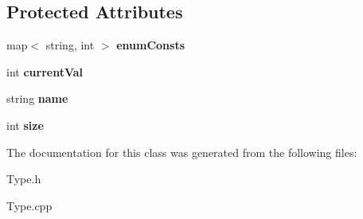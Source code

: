 \subsection*{Protected Attributes}
\begin{DoxyCompactItemize}
\item 
\hypertarget{classEnumType_ae294fba1687454c3f28825ab29031184}{map$<$ string, int $>$ {\bfseries enum\-Consts}}\label{classEnumType_ae294fba1687454c3f28825ab29031184}

\item 
\hypertarget{classEnumType_ac46ec8a6259d6c946716d89103125f89}{int {\bfseries current\-Val}}\label{classEnumType_ac46ec8a6259d6c946716d89103125f89}

\item 
\hypertarget{classType_ad7eeefba3dfcecbdaa98d46aaa84e389}{string {\bfseries name}}\label{classType_ad7eeefba3dfcecbdaa98d46aaa84e389}

\item 
\hypertarget{classType_a871302dc63ac1a37c0b6a225cf82048d}{int {\bfseries size}}\label{classType_a871302dc63ac1a37c0b6a225cf82048d}

\end{DoxyCompactItemize}


The documentation for this class was generated from the following files\-:\begin{DoxyCompactItemize}
\item 
Type.\-h\item 
Type.\-cpp\end{DoxyCompactItemize}
